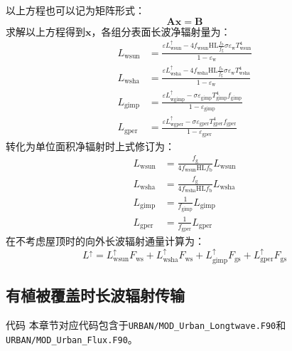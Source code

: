 以上方程也可以记为矩阵形式：
\begin{equation}
  \mathbf{A x}=\mathbf{B}
\end{equation}
求解以上方程得到$\mathbf{x}$，各组分表面长波净辐射量为：
\begin{equation}\label{L_wsun_wsha_gimp_pger_1}
  \begin{aligned}
    L_{\mathrm{wsun}} &=\frac{\varepsilon L_{\mathrm{wsun}}^{\uparrow}-4 f_{\mathrm{wsun}} \mathrm{HL} \frac{f_{\mathrm{b}}}{f_{\mathrm{g}}} \sigma \varepsilon_{\mathrm{w}} T_{\mathrm{wsun}}^{4}}{1-\varepsilon_{\mathrm{w}}} \\ L_{\mathrm{wsha}} &=\frac{\varepsilon L_{\mathrm{wsha}}^{\uparrow}-4 f_{\mathrm{wsha}} \mathrm{HL} \frac{f_{\mathrm{b}}}{f_{\mathrm{g}}} \sigma \varepsilon_{\mathrm{w}} T_{\mathrm{wsha}}^{4}}{1-\varepsilon_{\mathrm{w}}} \\ L_{\mathrm{gimp}} &=\frac{\varepsilon L_{\mathrm{w gimp}}^{\uparrow}-\sigma \varepsilon_{\mathrm{gimp}} T_{\mathrm{gimp}}^{4} f_{\mathrm{gimp}}}{1-\varepsilon_{\mathrm{gimp}}} \\ L_{\mathrm{gper}} &=\frac{\varepsilon L_{\mathrm{w gper}}^{\uparrow}-\sigma \varepsilon_{\mathrm{gper}} T_{\mathrm{gper}}^{4} f_{\mathrm{gper}}}{1-\varepsilon_{\mathrm{gper}}}
  \end{aligned}
\end{equation}
转化为单位面积净辐射时上式修订为：
\begin{equation}\label{L_wsun_wsha_gimp_pger_2}
  \begin{aligned}
    L_{\mathrm{wsun}} &=\frac{f_{\mathrm{g}}}{4 f_{\mathrm{wsun}} \mathrm{HL} f_{\mathrm{b}}} L_{\mathrm{wsun}} \\ L_{\mathrm{wsha}} &=\frac{f_{\mathrm{g}}}{4 f_{\mathrm{wsha}} \mathrm{HL} f_{\mathrm{b}}} L_{\mathrm{wsha}} \\ L_{\mathrm{gimp}} &=\frac{1}{f_{\mathrm{gimp}}} L_{\mathrm{gimp}} \\ L_{\mathrm{gper}} &=\frac{1}{f_{\mathrm{gper}}} L_{\mathrm{gper}}
  \end{aligned}
\end{equation}
在不考虑屋顶时的向外长波辐射通量计算为：
\begin{equation}
  L^{\uparrow}=L_{\mathrm{wsun}}^{\uparrow} F_{\mathrm{ws}}+L_{\mathrm{wsha}}^{\uparrow} F_{\mathrm{ws}}+L_{\mathrm{gimp}}^{\uparrow} F_{\mathrm{gs}}+L_{\mathrm{gper}}^{\uparrow} F_{\mathrm{gs}}
\end{equation}


\subsection{有植被覆盖时长波辐射传输}\label{有植被覆盖时长波辐射传输}
\begin{mymdframed}{代码}
  本章节对应代码包含于\texttt{URBAN/MOD\_Urban\_Longtwave.F90}和\texttt{URBAN/MOD\_Urban\_\allowbreak Flux.F90}。
\end{mymdframed}

